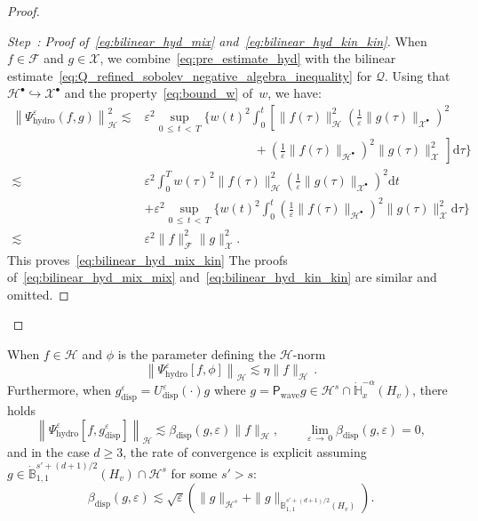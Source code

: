 \documentclass[10pt]{amsart}
\theoremstyle{definition}\newtheorem{defi}[theo]{Definition}\newtheorem{rema}[theo]{Remark}\newtheorem{exam}[theo]{Example}\newtheorem{exem}[theo]{Example}\newtheorem{nota}[theo]{Notation}
\newcommand{\hyd}{\mathrm{hydro}}
\renewcommand{\d}{\mathrm{d}}
\newcommand{\Wave}{\mathrm{wave}}
\newcommand{\disp}{\mathrm{disp}}
\newcommand{\bbH}{\mathbb{H}}
\newcommand{\bbB}{\mathbb{B}}
\newcommand{\XX}{\mathcal{X}}
\newcommand{\HH}{\mathcal{H}}
\newcommand{\PP}{\mathsf{P}}
\newcommand{\QQ}{\mathcal{Q}}
\newcommand{\FFF}{\mathscr{F}}
\newcommand{\HHH}{\mathscr{H}}
\newcommand{\GGG}{\mathscr{X}}
\newcommand{\Ss}{H}
\newcommand{\SSs}{\HH}
\newcommand{\rSSs}[1]{\HH^{#1}}
\newcommand{\SSsp}{\HH^{\bullet}}
\newcommand{\SSSs}{\HHH}
\newcommand{\SSl}{\XX}
\newcommand{\SSlp}{\XX^{\bullet}}
\newcommand{\SSSl}{\GGG}
\newcommand{\SSSm}{\FFF}
\renewcommand*\le{\leqslant}
\renewcommand*\ge{\geqslant}
\newcommand*\eps{{\varepsilon}}
\newcounter{stepcount}
\newenvironment{step}[1]{\refstepcounter{stepcount}\begin{proof}[Step~\thestepcount: #1]}{\let\qed\relax\end{proof}}
\begin{document}
\begin{proof}
\begin{step}{{Proof of~\eqref{eq:bilinear_hyd_mix} and~\eqref{eq:bilinear_hyd_kin_kin}}}\label{prfprop5.3stp2}
When $f \in \SSSm$ and $g \in \SSSl$, we combine~\eqref{eq:pre_estimate_hyd} with the bilinear estimate~\eqref{eq:Q_refined_sobolev_negative_algebra_inequality} for $\QQ$. Using that $\SSsp \hookrightarrow \SSlp$ and the property~\eqref{eq:bound_w} of~$w$, we have:
\begin{equation*}
\begin{split}
\left\| \Psi^\eps_\hyd (f, g) \right\|_\SSSs^2
\lesssim & \eps^2 \sup_{0\,\le\,t\,<\,T} \Bigg\{w(t)^2 \int_0^t \left[\| f(\tau) \|_{ \SSs }^2 \left(\frac{1}{\eps} \| g(\tau) \|_{\SSlp}\right)^2 \right. \\
& \left.\phantom{+++++++++} + \left(\frac{1}{\eps} \| f(\tau) \|_{\SSsp} \right)^2 \| g(\tau) \|_{ \SSl }^2 \, \right] \d \tau \Bigg\} \\
\lesssim & \eps^2 \int_0^T w(\tau)^2 \|f(\tau) \|_{ \SSs }^2 \left(\frac{1}{\eps} \| g(\tau) \|_{\SSlp}\right)^2 \d t\\
& + \eps^2 \sup_{0\,\le\,t\,<\,T} \Bigg\{w(t)^2 \int_0^t \left(\frac{1}{\eps} \| f(\tau) \|_{\SSsp} \right)^2 \| g(\tau) \|_{ \SSl }^2 \d \tau \Bigg\} \\
\lesssim & \eps^2 \| f \|_\SSSm^2 \| g \|_\SSSl^2.
\end{split}
\end{equation*}
This proves~\eqref{eq:bilinear_hyd_mix_kin} The proofs of~\eqref{eq:bilinear_hyd_mix_mix} and~\eqref{eq:bilinear_hyd_kin_kin} are similar and omitted.\qedhere
\end{step}\let\qed\relax
\end{proof}

\begin{prop}\label{prop:special_bilinear_hydrodynamic}
When $f \in \SSSs$ and $\phi$ is the parameter defining the $\SSSs$-norm
\begin{equation}\label{eq:bilinear_hyd_phi}
\left\| \Psi^\eps_\hyd[f, \phi] \right\|_\SSSs \lesssim \eta \| f \|_\SSSs\,.
\end{equation}
Furthermore, when $g^\eps_\disp = U^\eps_\disp(\cdot) g$ where $g = \PP_{\Wave} g \in \rSSs{s} \cap \dot{\bbH}^{-\alpha}_x (\Ss_v)$, there holds
\begin{equation}\label{eq:bilinear_hyd_disp}
\left\| \Psi^\eps_\hyd\left[f, g^\eps_\disp\right] 
\right\|_\SSSs \lesssim {\beta_{\disp}}(g, \eps) \| f \|_{ \SSSs }, \qquad \lim_{\eps\,\to\,0} {\beta_{\disp}}(g, \eps)=0,
\end{equation}
and in the case $d \ge 3$, the rate of convergence is explicit assuming $g \in \dot{\bbB}^{s' + (d+1)/2}_{1, 1} (\Ss_v) \cap \rSSs{s}$ for some $s'>s$:
\begin{equation*}
{\beta_{\disp}}(g, \eps) \lesssim \sqrt{\eps}
\left(\| g \|_{ \rSSs{s} } + \| g \|_{ \dot{\bbB}^{s' + (d+1)/2 }_{1, 1} \left(\Ss_v \right) }\right).
\end{equation*}
\end{prop}
\end{document}
